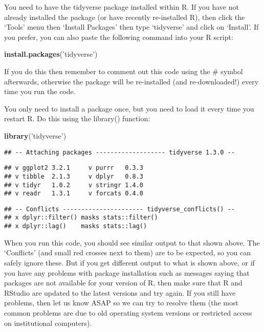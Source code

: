 \documentclass[
]{article}
\newenvironment{Shaded}{\begin{snugshade}}{\end{snugshade}}
\newcommand{\KeywordTok}[1]{\textcolor[rgb]{0.13,0.29,0.53}{\textbf{#1}}}
\newcommand{\NormalTok}[1]{#1}
\newcommand{\StringTok}[1]{\textcolor[rgb]{0.31,0.60,0.02}{#1}}
\begin{document}
You need to have the tidyverse package installed within R. If you have
not already installed the package (or have recently re-installed R),
then click the `Tools' menu then `Install Packages' then type
`tidyverse' and click on `Install'. If you prefer, you can also paste
the following command into your R script:

\begin{Shaded}
\begin{Highlighting}[]
\KeywordTok{install.packages}\NormalTok{(}\StringTok{'tidyverse'}\NormalTok{)}
\end{Highlighting}
\end{Shaded}

If you do this then remember to comment out this code using the \#
symbol afterwards, otherwise the package will be re-installed (and
re-downloaded!) every time you run the code.

You only need to install a package once, but you need to load it every
time you restart R. Do this using the library() function:

\begin{Shaded}
\begin{Highlighting}[]
\KeywordTok{library}\NormalTok{(}\StringTok{'tidyverse'}\NormalTok{)}
\end{Highlighting}
\end{Shaded}

\begin{verbatim}
## -- Attaching packages ------------------- tidyverse 1.3.0 --
\end{verbatim}

\begin{verbatim}
## v ggplot2 3.2.1     v purrr   0.3.3
## v tibble  2.1.3     v dplyr   0.8.3
## v tidyr   1.0.2     v stringr 1.4.0
## v readr   1.3.1     v forcats 0.4.0
\end{verbatim}

\begin{verbatim}
## -- Conflicts ---------------------- tidyverse_conflicts() --
## x dplyr::filter() masks stats::filter()
## x dplyr::lag()    masks stats::lag()
\end{verbatim}

When you run this code, you should see similar output to that shown
above. The `Conflicts' (and small red crosses next to them) are to be
expected, so you can safely ignore these. But if you get different
output to what is shown above, or if you have any problems with package
installation such as messages saying that packages are not available for
your version of R, then make sure that R and RStudio are updated to the
latest versions and try again. If you still have problems, then let us
know ASAP so we can try to resolve them (the most common problems are
due to old operating system versions or restricted access on
institutional computers).
\end{document}
